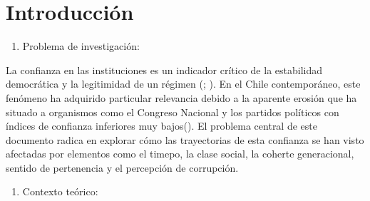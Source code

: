 \documentclass[
  spanish,
  a4paper,
  oneside]{scrbook}
\providecommand{\tightlist}{%
  \setlength{\itemsep}{0pt}\setlength{\parskip}{0pt}}
\begin{document}

\chapter{Introducción}\label{introducciuxf3n}

\begin{enumerate}
\def\labelenumi{\arabic{enumi}.}
\tightlist
\item
  Problema de investigación:
\end{enumerate}

La confianza en las instituciones es un indicador crítico de la
estabilidad democrática y la legitimidad de un régimen
(;
). En el Chile contemporáneo, este fenómeno
ha adquirido particular relevancia debido a la aparente erosión que ha
situado a organismos como el Congreso Nacional y los partidos políticos
con índices de confianza inferiores muy
bajos(). El problema central de este
documento radica en explorar cómo las trayectorias de esta confianza se
han visto afectadas por elementos como el timepo, la clase social, la
coherte generacional, sentido de pertenencia y el percepción de
corrupción.

\begin{enumerate}
\def\labelenumi{\arabic{enumi}.}
\setcounter{enumi}{1}
\tightlist
\item
  Contexto teórico:
\end{enumerate}
\end{document}
